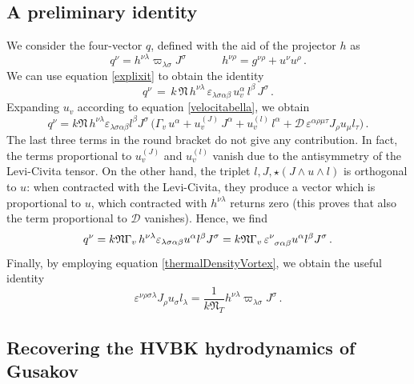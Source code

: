 \documentclass[preprints,article,accept,moreauthors,pdftex]{mdpi}
\newcommand{\spc}{\quad \quad \quad}
\begin{document}
\subsection{A preliminary identity}\label{preliminaryIdentity}

We consider the four-vector $q$, defined with the aid of the projector $h$  as
\begin{equation}
q^\nu =h^{\nu \lambda} \varpi_{\lambda \sigma} J^\sigma \,   \spc 
h^{\nu \rho} = g^{\nu \rho} + u^\nu u^\rho \, .
\end{equation}
We can use equation \eqref{explixit} to obtain the identity
\begin{equation}
q^\nu \,= \,k \,\mathfrak{N} \, h^{\nu \lambda}\,  \varepsilon_{\lambda \sigma \alpha \beta} \, u_v^\alpha \, l^\beta \, J^\sigma \, .
\end{equation}
Expanding $u_v$ according to equation \eqref{velocitabella}, we obtain
\begin{equation}
 q^\nu = k \mathfrak{N} \, h^{\nu \lambda}  \varepsilon_{\lambda \sigma \alpha \beta} l^\beta J^\sigma  \, 
 \big(\Gamma_v \, u^\alpha + u_v^{(J)} \, J^\alpha +u_v^{(l)} \, l^\alpha + \mathcal{D} \, \varepsilon^{\alpha \rho \mu \tau} J_\rho u_\mu l_\tau \big) \, . 
\end{equation} 
The last three terms in the round bracket do not give any contribution. In fact, the terms proportional to $u_v^{(J)}$ and $u_v^{(l)}$ vanish due to the antisymmetry of the Levi-Civita tensor. 
On the other hand, the triplet $l,J,\star(J \wedge u \wedge l)$ is orthogonal to $u$: when contracted with the Levi-Civita, they produce a vector which is proportional to $u$, which contracted with $h^{\nu \lambda}$ returns zero (this proves that also the term proportional to $\mathcal{D}$ vanishes). 
Hence, we find
\begin{equation}
q^\nu = k \mathfrak{N} \Gamma_v \, h^{\nu \lambda}  \varepsilon_{\lambda \sigma \alpha \beta} u^\alpha l^\beta J^\sigma 
= k \mathfrak{N} \Gamma_v \,\varepsilon\indices{^\nu _\sigma _\alpha _\beta} u^\alpha l^\beta J^\sigma
\, .  
\end{equation}
Finally, by employing equation \eqref{thermalDensityVortex}, we obtain the useful identity
\begin{equation}\label{identity}
\varepsilon^{\nu \rho \sigma  \lambda} J_\rho u_\sigma  l_\lambda  =\dfrac{1}{k\mathfrak{N}_T} h^{\nu \lambda} \varpi_{\lambda \sigma} J^\sigma \, . 
\end{equation}

\subsection{Recovering the HVBK hydrodynamics of Gusakov }
\label{IlcontoLab}
\end{document}
